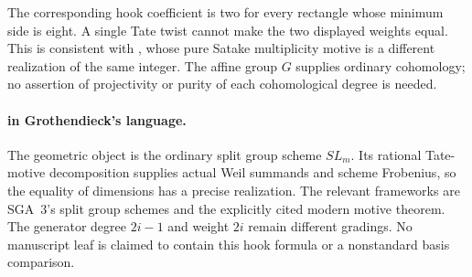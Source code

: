 The corresponding hook coefficient is two for every rectangle
whose minimum side is eight. A single Tate twist cannot make the
two displayed weights equal. This is consistent with ,
whose pure Satake multiplicity motive is a different realization
of the same integer. The affine group $G$ supplies ordinary
cohomology; no assertion of projectivity or purity of each
cohomological degree is needed.

\paragraph{ in Grothendieck's language.}
The geometric object is the ordinary split group scheme $SL_m$.
Its rational Tate-motive decomposition supplies actual Weil
summands and scheme Frobenius, so the equality of dimensions
has a precise realization. The relevant frameworks are SGA~3's
split group schemes and the explicitly cited modern motive
theorem. The generator degree $2i-1$ and weight $2i$ remain
different gradings. No manuscript leaf is claimed to contain
this hook formula or a nonstandard basis comparison.

